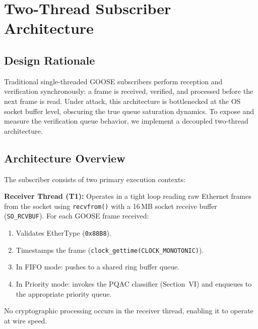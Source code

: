 \documentclass[journal]{IEEEtran}
\begin{document}
\section{Two-Thread Subscriber Architecture}

\subsection{Design Rationale}
Traditional single-threaded GOOSE subscribers perform reception and verification synchronously: a frame is received, verified, and processed before the next frame is read. Under attack, this architecture is bottlenecked at the OS socket buffer level, obscuring the true queue saturation dynamics. To expose and measure the verification queue behavior, we implement a decoupled two-thread architecture.

\subsection{Architecture Overview}
The subscriber consists of two primary execution contexts:

\textbf{Receiver Thread (T1):} Operates in a tight loop reading raw Ethernet frames from the socket using \texttt{recvfrom()} with a 16\,MB socket receive buffer (\texttt{SO\_RCVBUF}). For each GOOSE frame received:
\begin{enumerate}[leftmargin=*]
    \item Validates EtherType (\texttt{0x88B8}).
    \item Timestamps the frame (\texttt{clock\_gettime(CLOCK\_MONOTONIC)}).
    \item In FIFO mode: pushes to a shared ring buffer queue.
    \item In Priority mode: invokes the PQAC classifier (Section~VI) and enqueues to the appropriate priority queue.
\end{enumerate}

No cryptographic processing occurs in the receiver thread, enabling it to operate at wire speed.
\end{document}
